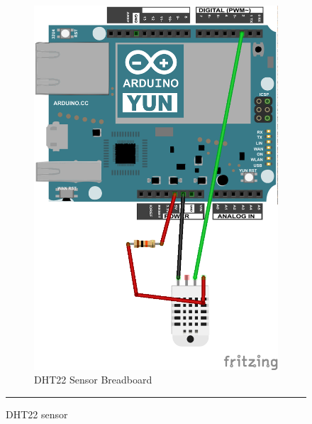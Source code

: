 \documentclass[12pt, a4paper,twoside]{tesi_upf}
\begin{document}
\begin{figure}
\begin{subfigure}[b]{0.3\textwidth}
                \includegraphics[width=\textwidth]{./Figures/Fritzing/HumiditySensor_bb.png}
                \caption{DHT22 Sensor Breadboard}
                \label{fig:HumiditySensordht22_bb}
        \end{subfigure}
        \rule{18em}{0.5pt}
        \caption{DHT22 sensor}\label{fig:DHT22sensor}
			\end{figure}
      
\end{document}
